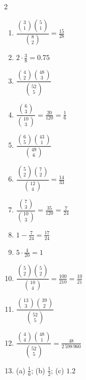 \documentclass[11pt]{article}
\begin{document}
\begin{keybox}
\begin{multicols}{2}
\small
\begin{enumerate}[leftmargin=*,itemsep=3pt]
  \item $\dfrac{\binom{3}{1}\binom{5}{1}}{\binom{8}{2}}=\tfrac{15}{28}$
  \item $2\cdot\tfrac{3}{8}=0.75$
  \item $\dfrac{\binom{4}{2}\binom{48}{3}}{\binom{52}{5}}$
  \item $\dfrac{\binom{6}{3}}{\binom{10}{3}}=\tfrac{20}{120}=\tfrac16$
  \item $\dfrac{\binom{6}{5}\binom{43}{1}}{\binom{49}{6}}$
  \item $\dfrac{\binom{5}{2}\binom{7}{2}}{\binom{12}{4}}=\tfrac{14}{33}$
  \item $\dfrac{\binom{7}{3}}{\binom{10}{3}}=\tfrac{35}{120}=\tfrac{7}{24}$
  \item $1-\tfrac{7}{24}=\tfrac{17}{24}$
  \item $5\cdot\tfrac{4}{20}=1$
  \item $\dfrac{\binom{5}{2}\binom{5}{2}}{\binom{10}{4}}=\tfrac{100}{210}=\tfrac{10}{21}$
  \item $\dfrac{\binom{13}{3}\binom{39}{2}}{\binom{52}{5}}$
  \item $\dfrac{\binom{4}{4}\binom{48}{1}}{\binom{52}{5}}=\tfrac{48}{2\,598\,960}$
  \item (a) $\tfrac16$; (b) $\tfrac12$; (c) $1.2$
\end{enumerate}
\end{multicols}
\end{keybox}
\end{document}
